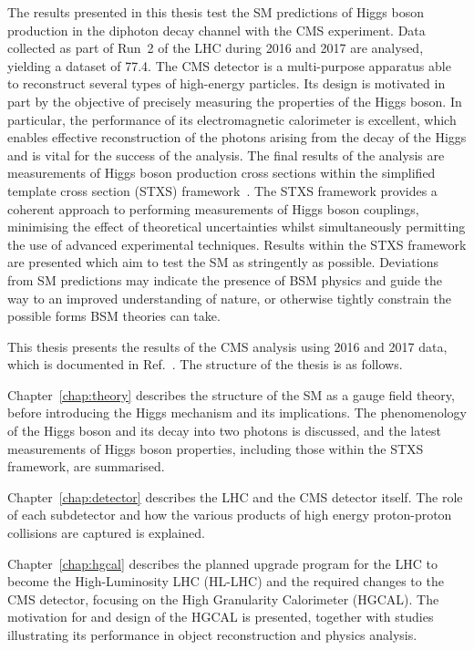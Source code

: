 The results presented in this thesis test the SM predictions of Higgs boson production
in the diphoton decay channel with the CMS experiment.
Data collected as part of Run~2 of the LHC during 2016 and 2017 are analysed, 
yielding a dataset of \SI{77.4}{\fbinv}.
The CMS detector is a multi-purpose apparatus able to reconstruct several types of high-energy particles.
Its design is motivated in part by the objective of precisely measuring the properties of the Higgs boson.
In particular, the performance of its electromagnetic calorimeter is excellent, 
which enables effective reconstruction of the photons arising from the decay of the Higgs 
and is vital for the success of the \Hgg analysis.
The final results of the analysis are measurements of Higgs boson production cross sections
within the simplified template cross section (STXS) framework~\cite{YR4}.
The STXS framework provides a coherent approach to performing measurements of Higgs boson couplings, 
minimising the effect of theoretical uncertainties 
whilst simultaneously permitting the use of advanced experimental techniques.
Results within the STXS framework are presented
which aim to test the SM as stringently as possible.
Deviations from SM predictions may indicate the presence of BSM physics 
and guide the way to an improved understanding of nature, 
or otherwise tightly constrain the possible forms BSM theories can take.

This thesis presents the results of the CMS \Hgg analysis using 2016 and 2017 data, 
which is documented in Ref.~\cite{HIG-18-029}.
The structure of the thesis is as follows.

Chapter~\ref{chap:theory} describes the structure of the SM as a gauge field theory, 
before introducing the Higgs mechanism and its implications.
The phenomenology of the Higgs boson and its decay into two photons is discussed, 
and the latest measurements of Higgs boson properties, including those within the STXS framework, 
are summarised.

Chapter~\ref{chap:detector} describes the LHC and the CMS detector itself.
The role of each subdetector and how the various products 
of high energy proton-proton collisions are captured is explained.

Chapter~\ref{chap:hgcal} describes the planned upgrade program for the LHC to become the High-Luminosity LHC (HL-LHC) 
and the required changes to the CMS detector, focusing on the High Granularity Calorimeter (HGCAL).
The motivation for and design of the HGCAL is presented, 
together with studies illustrating its performance in object reconstruction and physics analysis.

